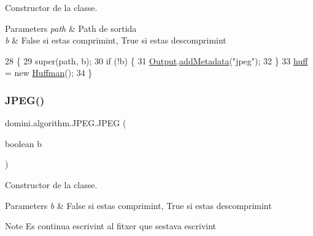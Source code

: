 Constructor de la classe. 


\begin{DoxyParams}{Parameters}
{\em path} & Path de sortida \\
\hline
{\em b} & False si estas comprimint, True si estas descomprimint \\
\hline
\end{DoxyParams}

\begin{DoxyCode}
28                                         \{
29         super(path, b);
30         \textcolor{keywordflow}{if} (!b) \{
31             \hyperlink{classdomini_1_1algorithm_1_1Algorithm_a4de9955411c656325adc391ef570c082}{Output}.\hyperlink{classpersistencia_1_1output_1_1Ctrl__Output_ae6d6857910a023982900ddc857b891f0}{addMetadata}(\textcolor{stringliteral}{"jpeg"});
32         \}
33         \hyperlink{classdomini_1_1algorithm_1_1JPEG_aacc6445baa7819e3f9139ffb78e0b8f4}{huff} = \textcolor{keyword}{new} \hyperlink{classHuffman}{Huffman}();
34     \}
\end{DoxyCode}
\mbox{\label{classdomini_1_1algorithm_1_1JPEG_ade39a15f3c5722b4975746fcee6ad364}} 
\subsubsection{\texorpdfstring{J\+P\+E\+G()}{JPEG()}\hspace{0.1cm}{\footnotesize\ttfamily [2/2]}}
{\footnotesize\ttfamily domini.\+algorithm.\+J\+P\+E\+G.\+J\+P\+EG (\begin{DoxyParamCaption}\item[{boolean}]{b }\end{DoxyParamCaption})\hspace{0.3cm}{\ttfamily [inline]}}



Constructor de la classe. 


\begin{DoxyParams}{Parameters}
{\em b} & False si estas comprimint, True si estas descomprimint \\
\hline
\end{DoxyParams}
\begin{DoxyNote}{Note}
Es continua escrivint al fitxer que s\textquotesingle{}estava escrivint 
\end{DoxyNote}

